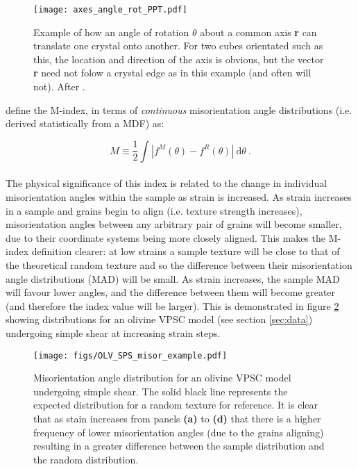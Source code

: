 \documentclass[a4paper,12pt]{report}
\numberwithin{equation}{chapter}
\begin{document}
\begin{figure}[h]
  \centering
    \texttt{[image: axes\_angle\_rot\_PPT.pdf]}
  \caption[Angle/axis of rotation example]{Example of how an angle of rotation $\theta$ about a common axis \textbf{r} can translate one crystal onto another. For two cubes orientated such as this, the location and direction of the axis is obvious, but the vector \textbf{r} need not folow a crystal edge as in this example (and often will not). After \cite{Randle2000}.}
  \label{fig:angle-axis_example}
\end{figure}

\cite{Skemer} define the M-index, in terms of \emph{continuous} misorientation angle distributions (i.e. derived statistically from a MDF) as:

\begin{equation} \label{eq:Mindex_cont}
M \equiv \frac{1}{2} \int | f^M(\theta) - f^R(\theta) |\ \mathrm{d}\theta \ .
\end{equation}  
\\   
The physical significance of this index is related to the change in individual misorientation angles within the sample as strain is increased. As strain increases in a sample and grains begin to align (i.e. texture strength increases), misorientation angles between any arbitrary pair of grains will become smaller, due to their coordinate systems being more closely aligned. This makes the M-index definition clearer: at low strains a sample texture will be close to that of the theoretical random texture and so the difference between their misorientation angle distributions (MAD) will be small. As strain increases, the sample MAD will favour lower angles, and the difference between them will become greater (and therefore the index value will be larger). This is demonstrated in figure \ref{fig:misorientation_example} showing distributions for an olivine VPSC model (see section \ref{sec:data}) undergoing simple shear at increasing strain steps.


\begin{figure}[t]
  \centering
    \texttt{[image: figs/OLV\_SPS\_misor\_example.pdf]}
  \caption[Misorientation angle distribution example (olivine VPSC)]{Misorientation angle distribution for an olivine VPSC model undergoing simple shear. The solid black line represents the expected distribution for a random texture for reference. It is clear that as stain increases from panels \textbf{(a)} to \textbf{(d)} that there is a higher frequency of lower misorientation angles (due to the grains aligning) resulting in a greater difference between the sample distribution and the random distribution.}
  \label{fig:misorientation_example}
\end{figure}
\end{document}
